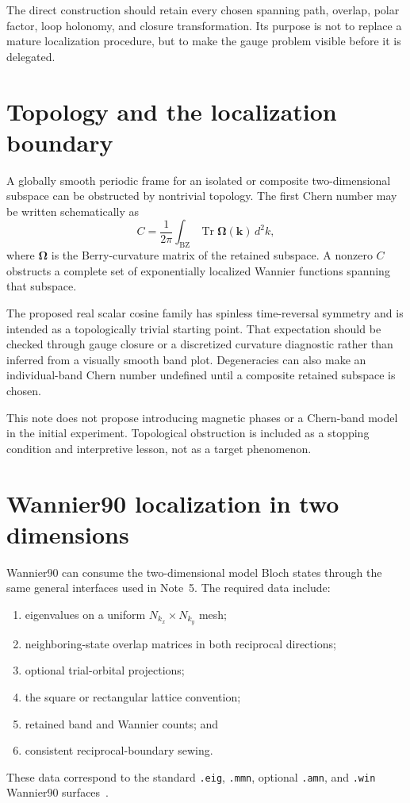 The direct construction should retain every chosen spanning path, overlap,
polar factor, loop holonomy, and closure transformation. Its purpose is not to
replace a mature localization procedure, but to make the gauge problem visible
before it is delegated.

\section*{Topology and the localization boundary}

A globally smooth periodic frame for an isolated or composite two-dimensional
subspace can be obstructed by nontrivial topology. The first Chern number may
be written schematically as
\begin{equation}
    C
    =
    \frac{1}{2\pi}
    \int_{\mathrm{BZ}}
    \operatorname{Tr}\mathbf\Omega(\mathbf k)\,d^2k,
\end{equation}
where $\mathbf\Omega$ is the Berry-curvature matrix of the retained subspace.
A nonzero $C$ obstructs a complete set of exponentially localized Wannier
functions spanning that subspace.

The proposed real scalar cosine family has spinless time-reversal symmetry and
is intended as a topologically trivial starting point. That expectation should
be checked through gauge closure or a discretized curvature diagnostic rather
than inferred from a visually smooth band plot. Degeneracies can also make an
individual-band Chern number undefined until a composite retained subspace is
chosen.

This note does not propose introducing magnetic phases or a Chern-band model in
the initial experiment. Topological obstruction is included as a stopping
condition and interpretive lesson, not as a target phenomenon.

\section*{Wannier90 localization in two dimensions}

Wannier90 can consume the two-dimensional model Bloch states through the same
general interfaces used in Note~5. The required data include:
\begin{enumerate}
    \item eigenvalues on a uniform $N_{k_x}\times N_{k_y}$ mesh;
    \item neighboring-state overlap matrices in both reciprocal directions;
    \item optional trial-orbital projections;
    \item the square or rectangular lattice convention;
    \item retained band and Wannier counts; and
    \item consistent reciprocal-boundary sewing.
\end{enumerate}
These data correspond to the standard \texttt{.eig}, \texttt{.mmn}, optional
\texttt{.amn}, and \texttt{.win} Wannier90 surfaces~\cite{pizzi2020}.

